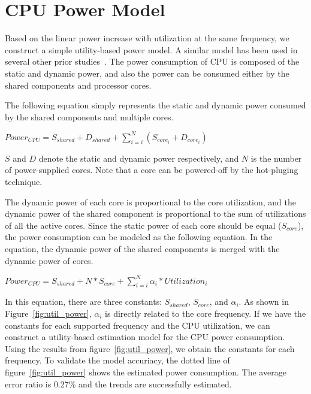 \section{CPU Power Model}

Based on the linear power increase with utilization at the same frequency,
we construct a simple utility-based power model. A similar model
has been used in several other prior studies~\cite{VMpower, isca11DVFS}.
The power consumption of CPU is composed of the static and dynamic power,
and also the power can be consumed either by the shared components and processor cores.

The following equation simply represents the static and dynamic
power consumed by the shared components and multiple cores.

\begin{center}
\vspace{-0.05in}
$Power_{CPU} = S_{shared} + D_{shared} + \sum_{i=i}^{N} (S_{core_i} + D_{core_i})$
\vspace{-0.05in}
\end{center}

$S$ and $D$ denote the static and dynamic power respectively, and $N$ is the number of power-supplied cores. 
Note that a core can be powered-off by the hot-pluging technique.

The dynamic power of each core is proportional to the core utilization,
and the dynamic power of the shared component is proportional to the sum
of utilizations of all the active cores. 
Since the static power of each core should be equal ($S_{core}$),
the power consumption can be modeled as the following equation.
In the equation, the dynamic power of the shared components is
merged with the dynamic power of cores.

\begin{center}
\vspace{-0.05in}
$Power_{CPU} = S_{shared} + N * S_{core} + \sum_{i=i}^{N} \alpha_i * Utilization_i$
\vspace{-0.05in}
\end{center}

In this equation, there are three constants: $S_{shared}$, $S_{core}$, and $\alpha_i$.
As shown in Figure~\ref{fig:util_power}, $\alpha_i$ is directly related to the core frequency.
If we have the constants for each supported frequency and the CPU utilization,
we can construct a utility-based estimation model for the CPU power consumption.
Using the results from figure~\ref{fig:util_power}, we obtain the constants for each frequency.
To validate the model accuriacy, the dotted line of figure~\ref{fig:util_power} shows the 
estimated power consumption.
The average error ratio is 0.27\% and the trends are successfully estimated.

